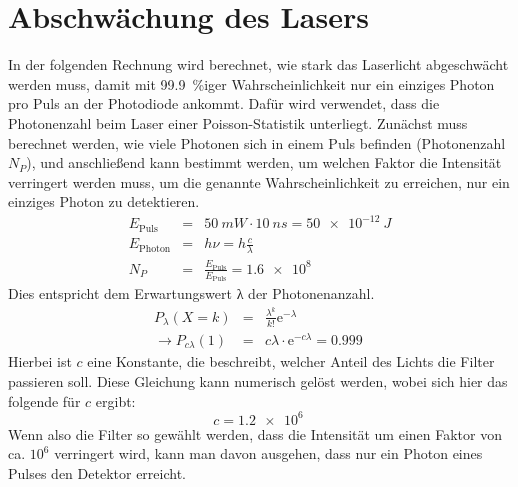\appendix
\section{Abschwächung des Lasers}
\label{sec:laser}
In der folgenden Rechnung wird berechnet, wie stark das Laserlicht abgeschwächt
werden muss, damit mit \SI{99,9}{\percent}iger Wahrscheinlichkeit nur ein
einziges Photon pro Puls an der Photodiode ankommt. Dafür wird verwendet, dass
die Photonenzahl beim Laser einer Poisson-Statistik unterliegt. Zunächst muss
berechnet werden, wie viele Photonen sich in einem Puls befinden (Photonenzahl
$N_P$), und anschließend kann bestimmt werden, um welchen Faktor die Intensität
verringert werden muss, um die genannte Wahrscheinlichkeit zu erreichen, nur ein
einziges Photon zu detektieren.
\begin{eqnarray}
E_{\mathrm{Puls}} &=& \SI{50}{mW}\cdot\SI{10}{ns} = \SI{50e-12}{J}\\
E_{\mathrm{Photon}} &=& hν = h\frac{c}{λ}\\
N_P &=& \frac{E_{\mathrm{Puls}}}{E_{\mathrm{Puls}}} = \SI{1,6e8}{}
\end{eqnarray}
Dies entspricht dem Erwartungswert λ der Photonenanzahl.
\begin{eqnarray}
P_λ(X=k) &=& \frac{λ^k}{k!}\mathrm{e}^{-λ}\\
\rightarrow P_{cλ}(1) &=& cλ\cdot\mathrm{e}^{-cλ} = \SI{0.999}{}
\end{eqnarray}
Hierbei ist $c$ eine Konstante, die beschreibt, welcher Anteil des Lichts die
Filter passieren soll. Diese Gleichung kann numerisch gelöst werden, wobei sich
hier das folgende für $c$ ergibt:
\begin{equation}
c = \SI{1.2e6}{}
\end{equation}
Wenn also die Filter so gewählt werden, dass die Intensität um einen Faktor von
ca. $10^6$ verringert wird, kann man davon ausgehen, dass nur ein Photon eines
Pulses den Detektor erreicht.

